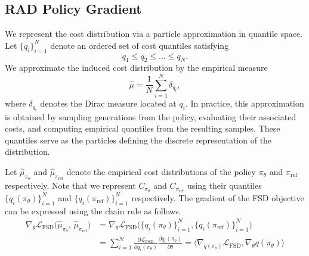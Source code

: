 \subsection{RAD Policy Gradient}
\label{sec:sard-pol-grad}


We represent the cost distribution via a particle approximation in quantile space. Let $\{ q_i \}_{i=1}^{N}$ denote an ordered set of cost quantiles satisfying
\[
  q_1 \leq q_2 \leq \dots \leq q_N .
\]
We approximate the induced cost distribution by the empirical measure
\[
  \hat{\mu} = \frac{1}{N} \sum_{i=1}^{N} \delta_{q_i},
\]
where $\delta_{q_i}$ denotes the Dirac measure located at $q_i$. In practice, this approximation is obtained by sampling generations from the policy, evaluating their associated costs, and computing empirical quantiles from the resulting samples. These quantiles serve as the particles defining the discrete representation of the distribution.

Let $\hat{\mu}_{\pi_{\theta}}$ and $\hat{\mu}_{\pi_{\mathrm{ref}}}$ denote the empirical cost distributions of the policy $\pi_{\theta}$ and $\pi_{\mathrm{ref}}$ respectively. Note that we represent $C_{\pi_{\theta}}$ and $C_{\pi_{\mathrm{ref}}}$ using their quantiles $\{q_{i}(\pi_{\theta})\}_{i=1}^{N}$ and $\{q_{i}(\pi_{\mathrm{ref}})\}_{i=1}^{N}$ respectively. The gradient of the FSD objective can be expressed using the chain rule as follows.
\begin{align}
  \nabla_{\theta} \mathcal{L}_{\mathrm{FSD}}\!\big(\hat{\mu}_{\pi_{\theta}},\,\hat{\mu}_{\pi_{\mathrm{ref}}}\big) &= \nabla_{\theta} \mathcal{L}_{\mathrm{FSD}}\big(\{q_{i}(\pi_{\theta})\}_{i=1}^{N}, \{q_{i}(\pi_{\mathrm{ref}})\}_{i=1}^{N}\big)\\
  &= \sum_{i=1}^{N} \frac{\partial \mathcal{L}_{\mathrm{FSD}}}{\partial q_i(\pi_{\theta})} \frac{\partial q_i(\pi_{\theta})}{\partial \theta} = \Big\langle \nabla_{q(\pi_{\theta})}\mathcal{L}_{\mathrm{FSD}}, \nabla_{\theta} q(\pi_{\theta}) \Big\rangle
\end{align}

